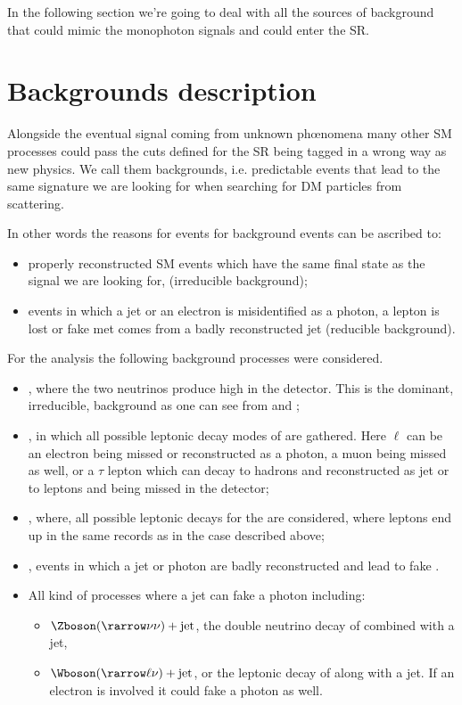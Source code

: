 In the following section we're going to deal with all the sources of background that could mimic the monophoton signals and could enter the SR.

\section{Backgrounds description}
Alongside the eventual signal coming from unknown ph\oe nomena many other SM processes could pass the cuts defined for the SR being tagged in a wrong way as new physics. We call them backgrounds, i.e. predictable events that lead to the same signature we are looking for when searching for DM particles from \pp scattering.

In other words the reasons for events for background events can be ascribed to:
\begin{itemize}
\item properly reconstructed SM events which have the same final state as the signal we are looking for, (irreducible background);
\item events in which a jet or an electron is misidentified as a photon, a lepton is lost or fake met comes from a badly reconstructed jet (reducible background).
\end{itemize}

For the \mph analysis the following background processes were considered.
\begin{itemize}
\item \znng\!, where the two neutrinos produce high \met in the detector. This is the dominant, irreducible, background as one can see from \Fig{\ref{subfig:SRp}} and \Fig{\ref{subfig:SRm}};
\item \wg\!, in which all possible leptonic decay modes of \Wboson are gathered. Here $\ell$ can be an electron being missed or reconstructed as a photon, a muon being missed as well, or a $\tau$ lepton which can decay to hadrons and reconstructed as jet or to leptons and being missed in the detector;
\item \zg\!, where, all possible leptonic decays for the \Zboson are considered, where leptons end up in the same records as in the \Wboson case described above;
\item \gj\!, events in which a jet or photon are badly reconstructed and lead to fake \met.
\item All kind of processes where a jet can fake a photon including:
  \begin{itemize}
  \item $\Zboson(\rarrow \nu\nu) + \text{jet}$, the double neutrino decay of \Zboson combined with a jet,
  \item $\Wboson(\rarrow \ell\nu) + \text{jet}$, or the leptonic decay of \Wboson along with a jet. If an electron is involved it could fake a photon as well.
  \end{itemize}
\end{itemize}


